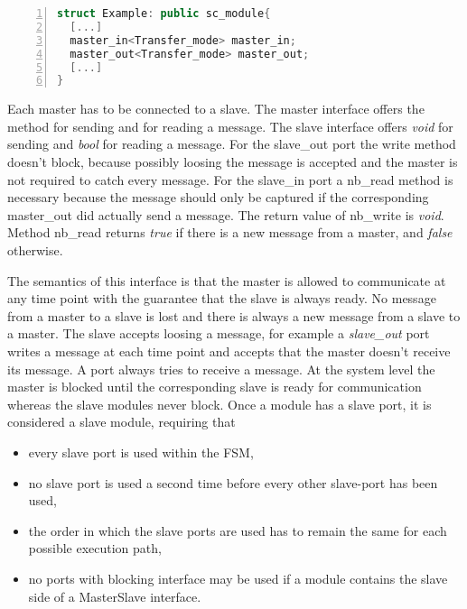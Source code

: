\begin{lstlisting}[language=C++,
caption={Example of all port interfaces},
label={lst:ports_interface},
numbers=left,
captionpos=b,  
basicstyle={\footnotesize},
xleftmargin=5.0ex]
struct Example: public sc_module{
  [...]
  master_in<Transfer_mode> master_in;
  master_out<Transfer_mode> master_out;
  [...]
}
\end{lstlisting}

Each master has to be connected to a slave. %
The master interface offers the 
method for sending and  for reading a
message. %
The slave interface offers \textit{void}
 for sending and \textit{bool}
 for reading a message. %
For the slave\_out port the write method doesn't block, because
possibly loosing the message is accepted and the master is not
required to catch every message. %
For the slave\_in port a nb\_read method is necessary because the
message should only be captured if the corresponding master\_out did
actually send a message. %
The return value of nb\_write is \textit{void}. %
Method nb\_read returns \textit{true} if there is a new message from a
master, and \textit{false} otherwise. %

The semantics of this interface is that the master is allowed to
communicate at any time point with the guarantee that the slave is
always ready. %
No message from a master to a slave is lost and there is always a new
message from a slave to a master. %
The slave accepts loosing a message, for example a \textit{slave\_out}
port writes a message at each time point and accepts that the master
doesn't receive its message. %
A  port always tries to receive a message. %
At the system level the master is blocked until the corresponding
slave is ready for communication whereas the slave modules never
block. %
Once a module has a slave port, it is considered a slave module,
requiring that
\begin{itemize}
 \item every slave port is used within the FSM, 
 \item no slave port is used a second time before every other slave-port has been used, 
 \item the order in which the slave ports are used has to remain the same for each possible execution path, 
 \item no ports with blocking interface may be used if a module
   contains the slave side of a MasterSlave interface. %
\end{itemize}

